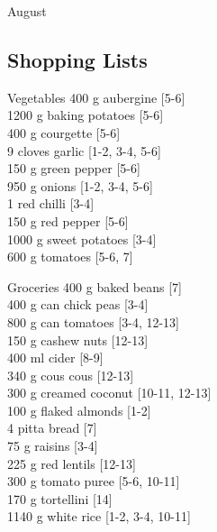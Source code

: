 \begin{menu}{August}
    \subsection*{Shopping Lists}
      \begin{shoppinglist}{Vegetables}
      400 g aubergine {\scriptsize[5-6]}\\
      1200 g baking potatoes {\scriptsize[5-6]}\\
      400 g courgette {\scriptsize[5-6]}\\
      9 cloves garlic {\scriptsize[1-2, 3-4, 5-6]}\\
      150 g green pepper {\scriptsize[5-6]}\\
      950 g onions {\scriptsize[1-2, 3-4, 5-6]}\\
      1  red chilli {\scriptsize[3-4]}\\
      150 g red pepper {\scriptsize[5-6]}\\
      1000 g sweet potatoes {\scriptsize[3-4]}\\
      600 g tomatoes {\scriptsize[5-6, 7]}\\
      \end{shoppinglist}%
      \begin{shoppinglist}{Groceries}
      400 g baked beans {\scriptsize[7]}\\
      400 g can chick peas {\scriptsize[3-4]}\\
      800 g can tomatoes {\scriptsize[3-4, 12-13]}\\
      150 g cashew nuts {\scriptsize[12-13]}\\
      400 ml cider {\scriptsize[8-9]}\\
      340 g cous cous {\scriptsize[12-13]}\\
      300 g creamed coconut {\scriptsize[10-11, 12-13]}\\
      100 g flaked almonds {\scriptsize[1-2]}\\
      4  pitta bread {\scriptsize[7]}\\
      75 g raisins {\scriptsize[3-4]}\\
      225 g red lentils {\scriptsize[12-13]}\\
      300 g tomato puree {\scriptsize[5-6, 10-11]}\\
      170 g tortellini {\scriptsize[14]}\\
      1140 g white rice {\scriptsize[1-2, 3-4, 10-11]}\\
      \end{shoppinglist}%

\end{menu}
